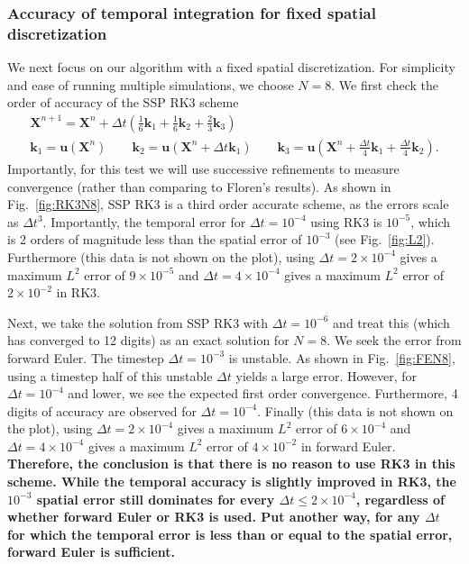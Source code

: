 \subsubsection{Accuracy of temporal integration for fixed spatial discretization}
\label{sec:rk3fe}
We next focus on our algorithm with a fixed spatial discretization. For simplicity and ease of running multiple simulations, we choose $N=8$. We first check the order of accuracy of the SSP RK3 scheme
\begin{gather}
\bm{X}^{n+1} = \bm{X}^n + \Delta t \left(\frac{1}{6}\bm{k}_1 + \frac{1}{6}\bm{k}_2+\frac{2}{3}\bm{k}_3\right)\\[4 pt]
\bm{k}_1 = \bm{u}\left(\bm{X}^n\right) \qquad \bm{k}_2 = \bm{u}\left(\bm{X}^n + \Delta t \bm{k}_1\right) \qquad \bm{k}_3 = \bm{u}\left(\bm{X}^n + \frac{\Delta t}{4} \bm{k}_1 + \frac{\Delta t}{4} \bm{k}_2\right).
\end{gather}
Importantly, for this test we will use successive refinements to measure convergence (rather than comparing to Floren's results). As shown in Fig.\ \ref{fig:RK3N8}, SSP RK3 is a third order accurate scheme, as the errors scale as $\Delta t^3$. Importantly, the temporal error for $\Delta t = 10^{-4}$ using RK3 is $10^{-5}$, which is 2 orders of magnitude less than the spatial error of $10^{-3}$ (see Fig.\ \ref{fig:L2}). Furthermore (this data is not shown on the plot), using $\Delta t = 2 \times 10^{-4}$ gives a maximum $L^2$ error of $9 \times 10^{-5}$ and $\Delta t = 4 \times 10^{-4}$ gives a maximum $L^2$ error of $2 \times 10^{-2}$ in RK3. 

Next, we take the solution from SSP RK3 with $\Delta t =10^{-6}$ and treat this (which has converged to 12 digits) as an exact solution for $N=8$. We seek the error from forward Euler. The timestep $\Delta t =10^{-3}$ is unstable. As shown in Fig.\ \ref{fig:FEN8}, using a timestep half of this unstable $\Delta t$ yields a large error. However, for $\Delta t =10^{-4}$ and lower, we see the expected first order convergence. Furthermore, 4 digits of accuracy are observed for $\Delta t =10^{-4}$. Finally (this data is not shown on the plot), using $\Delta t = 2 \times 10^{-4}$ gives a maximum $L^2$ error of $6 \times 10^{-4}$ and $\Delta t = 4 \times 10^{-4}$ gives a maximum $L^2$ error of $4 \times 10^{-2}$ in forward Euler. \textbf{Therefore, the conclusion is that there is no reason to use RK3 in this scheme. While the temporal accuracy is slightly improved in RK3, the $10^{-3}$ spatial error still dominates for every $\Delta t \leq 2 \times 10^{-4}$, regardless of whether forward Euler or RK3 is used. Put another way, for any $\Delta t$ for which the temporal error is less than or equal to the spatial error, forward Euler is sufficient.}

